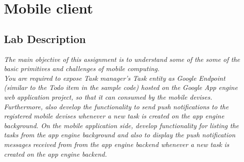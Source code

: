 \chapter{Mobile client}
\minitoc

\section{Lab Description}

\textit{The main objective of this assignment is to understand some of the some of the basic primitives and challenges of mobile computing.\\
You are required to expose Task manager’s Task entity as Google Endpoint (similar to the Todo item in the sample code) hosted on the Google App engine web application project, so that it can consumed by the mobile devises. Furthermore, also develop the functionality to send push notifications to the registered mobile devises whenever a new task is created on the app engine background. On the mobile application side, develop functionality for listing the tasks from the app engine background and also to display the push notification messages received from from the app engine backend whenever a new task is created on the app engine backend.}


